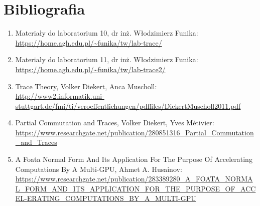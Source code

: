 \documentclass[11pt]{article}
\begin{document}
    \hypertarget{bibliografia}{%
\section{Bibliografia}\label{bibliografia}}

\begin{enumerate}
\def\labelenumi{\arabic{enumi}.}
\item
  Materiały do laboratorium 10, dr inż. Włodzimierz Funika:\\
  \url{https://home.agh.edu.pl/~funika/tw/lab-trace/}
\item
  Materiały do laboratorium 11, dr inż. Włodzimierz Funika:\\
  \url{https://home.agh.edu.pl/~funika/tw/lab-trace2/}
\item
  Trace Theory, Volker Diekert, Anca Muscholl:\\
  \url{http://www2.informatik.uni-stuttgart.de/fmi/ti/veroeffentlichungen/pdffiles/DiekertMuscholl2011.pdf}
\item
  Partial Commutation and Traces, Volker Diekert, Yves Métivier:\\
  \url{https://www.researchgate.net/publication/280851316_Partial_Commutation_and_Traces}
\item
  A Foata Normal Form And Its Application For The Purpose Of
  Accel­erating Computations By A Multi-GPU, Ahmet A. Husainov:\\
  \url{https://www.researchgate.net/publication/283389280_A_FOATA_NORMAL_FORM_AND_ITS_APPLICATION_FOR_THE_PURPOSE_OF_ACCEL-ERATING_COMPUTATIONS_BY_A_MULTI-GPU}
\end{enumerate}


    
    
    
\end{document}
